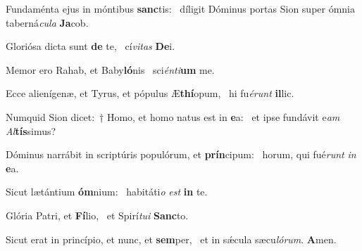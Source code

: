 \item Fundaménta ejus in móntibus \textbf{sanc}tis:~\psstar{} díligit Dóminus portas Sion super ómnia taberná\textit{cula} \textbf{Ja}cob.
\item Gloriósa dicta sunt \textbf{de} te,~\psstar{} cí\textit{vitas} \textbf{De}i.
\item Memor ero Rahab, et Baby\textbf{ló}nis~\psstar{} sci\textit{énti}\textbf{um} me.
\item Ecce alienígenæ, et Tyrus, et pópulus Æ\textbf{thí}opum,~\psstar{} hi fu\textit{érunt} \textbf{il}lic.
\item Numquid Sion dicet:~† Homo, et homo natus est in \textbf{e}a:~\psstar{} et ipse fundávit e\textit{am} \textit{Al}\textbf{tís}simus?
\item Dóminus narrábit in scriptúris populórum, et \textbf{prín}cipum:~\psstar{} horum, qui fué\textit{runt} \textit{in} \textbf{e}a.
\item Sicut lætántium \textbf{óm}nium:~\psstar{} habitáti\textit{o} \textit{est} \textbf{in} te.
\item Glória Patri, et \textbf{Fí}lio,~\psstar{} et Spirí\textit{tui} \textbf{Sanc}to.
\item Sicut erat in princípio, et nunc, et \textbf{sem}per,~\psstar{} et in sǽcula sæcu\textit{lórum}. \textbf{A}men.
